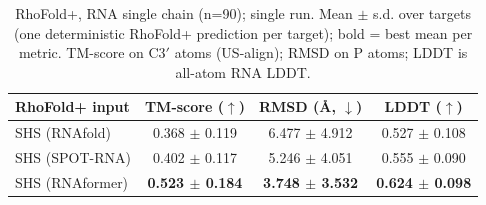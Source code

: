 \begin{table}[htbp]
\centering
\caption{RhoFold+, RNA single chain (n=90); single run. Mean $\pm$ s.d. over targets (one deterministic RhoFold+ prediction per target); bold = best mean per metric. TM-score on C3$'$ atoms (US-align); RMSD on P atoms; LDDT is all-atom RNA LDDT.}
\label{tab:rf_rna_single_chain}
\begin{tabular}{lccc}
\toprule
RhoFold+ input & TM-score ($\uparrow$) & RMSD (\AA, $\downarrow$) & LDDT ($\uparrow$) \\
\midrule
SHS (RNAfold) & 0.368 $\pm$ 0.119 & 6.477 $\pm$ 4.912 & 0.527 $\pm$ 0.108 \\
SHS (SPOT-RNA) & 0.402 $\pm$ 0.117 & 5.246 $\pm$ 4.051 & 0.555 $\pm$ 0.090 \\
SHS (RNAformer) & \textbf{0.523 $\pm$ 0.184} & \textbf{3.748 $\pm$ 3.532} & \textbf{0.624 $\pm$ 0.098} \\
\bottomrule
\end{tabular}
\end{table}
